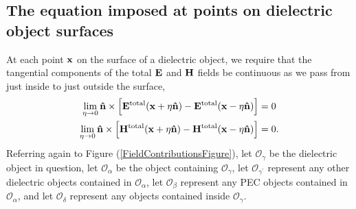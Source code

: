\documentclass[letterpaper]{article}
\begin{document}
\subsection{The equation imposed at points on dielectric object surfaces}

At each point $\mathbf{x}$ on the surface of a dielectric object, we require
that the tangential components of the total $\mathbf{E}$ and $\mathbf{H}$ fields
be continuous as we pass from just inside to just outside the 
surface,
\begin{subequations}
\begin{align}
 \lim_{\eta \to 0} \mathbf{\hat n}\times 
 \Big[ \mathbf{E}^{\hbox{\scriptsize{total}}}(\mathbf{x} + \eta\mathbf{\hat n})
      -\mathbf{E}^{\hbox{\scriptsize{total}}}(\mathbf{x} - \eta\mathbf{\hat n})
 \Big] 
&= 0 
\\
 \lim_{\eta \to 0} \mathbf{\hat n}\times 
 \Big[ \mathbf{H}^{\hbox{\scriptsize{total}}}(\mathbf{x} + \eta\mathbf{\hat n})
      -\mathbf{H}^{\hbox{\scriptsize{total}}}(\mathbf{x} - \eta\mathbf{\hat n})
 \Big] 
&= 0.
\label{DielectricEquation1}
\end{align}
\end{subequations}
Referring again to Figure (\ref{FieldContributionsFigure}), let 
$\mathcal{O}_\gamma$ be the dielectric object in question, let 
$\mathcal{O}_\alpha$ be the object containing 
$\mathcal{O}_\gamma$, 
let $\mathcal{O}_{\gamma^\prime}$ represent any other dielectric
objects contained in $\mathcal{O}_\alpha$, 
let $\mathcal{O}_{\beta}$ represent any PEC objects contained 
in $\mathcal{O}_\alpha$, and let $\mathcal{O}_\delta$ represent 
any objects contained inside $\mathcal{O}_\gamma$.
\end{document}
